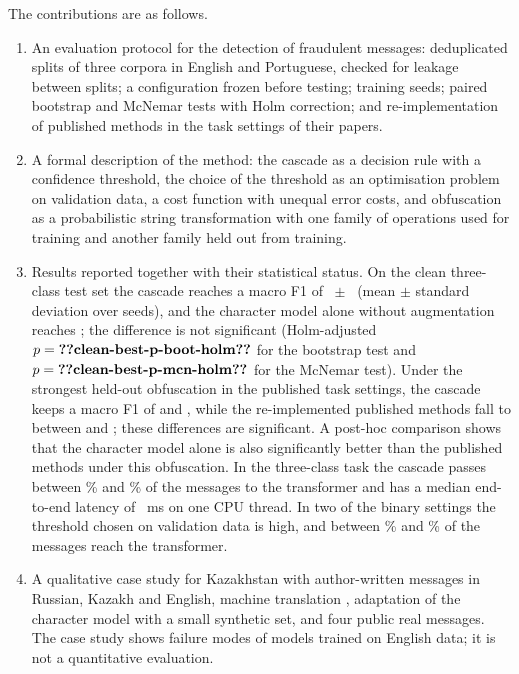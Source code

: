 The contributions are as follows.
\begin{enumerate}
\item An evaluation protocol for the detection of fraudulent messages: deduplicated splits of three corpora in English and Portuguese, checked for leakage between splits; a configuration frozen before testing;  training seeds; paired bootstrap and McNemar tests with Holm correction; and re-implementation of published methods in the task settings of their papers.
\item A formal description of the method: the cascade as a decision rule with a confidence threshold, the choice of the threshold as an optimisation problem on validation data, a cost function with unequal error costs, and obfuscation as a probabilistic string transformation with one family of operations used for training and another family held out from training.
\item Results reported together with their statistical status. On the clean three-class test set the cascade reaches a macro F1 of ~$\pm$~ (mean $\pm$ standard deviation over seeds), and the character model alone without augmentation reaches ; the difference is not significant (Holm-adjusted $p=\val{clean-best-p-boot-holm}$ for the bootstrap test and $p=\val{clean-best-p-mcn-holm}$ for the McNemar test). Under the strongest held-out obfuscation in the published task settings, the cascade keeps a macro F1 of  and , while the re-implemented published methods fall to between  and ; these differences are significant. A post-hoc comparison shows that the character model alone is also significantly better than the published methods under this obfuscation. In the three-class task the cascade passes between \% and \% of the messages to the transformer and has a median end-to-end latency of ~ms on one CPU thread. In two of the binary settings the threshold chosen on validation data is high, and between \% and \% of the messages reach the transformer.
\item A qualitative case study for Kazakhstan with author-written messages in Russian, Kazakh and English, machine translation \cite{nllb2024}, adaptation of the character model with a small synthetic set, and four public real messages. The case study shows failure modes of models trained on English data; it is not a quantitative evaluation.
\end{enumerate}

